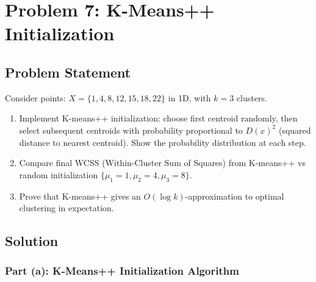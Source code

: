 \documentclass[12pt]{article}
\begin{document}
\section{Problem 7: K-Means++ Initialization}

\subsection{Problem Statement}

Consider points: $X = \{1, 4, 8, 12, 15, 18, 22\}$ in 1D, with $k=3$ clusters.

\begin{enumerate}
\item[(a)] Implement K-means++ initialization: choose first centroid randomly, then select subsequent centroids with probability proportional to $D(x)^2$ (squared distance to nearest centroid). Show the probability distribution at each step.
\item[(b)] Compare final WCSS (Within-Cluster Sum of Squares) from K-means++ vs random initialization $\{\mu_1=1, \mu_2=4, \mu_3=8\}$.
\item[(c)] Prove that K-means++ gives an $O(\log k)$-approximation to optimal clustering in expectation.
\end{enumerate}

\subsection{Solution}

\subsubsection{Part (a): K-Means++ Initialization Algorithm}
\end{document}
